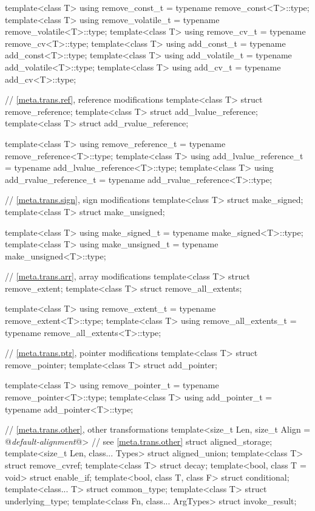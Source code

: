 \begin{codeblock}
{  template<class T>
    using remove_const_t    = typename remove_const<T>::type;
  template<class T>
    using remove_volatile_t = typename remove_volatile<T>::type;
  template<class T>
    using remove_cv_t       = typename remove_cv<T>::type;
  template<class T>
    using add_const_t       = typename add_const<T>::type;
  template<class T>
    using add_volatile_t    = typename add_volatile<T>::type;
  template<class T>
    using add_cv_t          = typename add_cv<T>::type;

  // \ref{meta.trans.ref}, reference modifications
  template<class T> struct remove_reference;
  template<class T> struct add_lvalue_reference;
  template<class T> struct add_rvalue_reference;

  template<class T>
    using remove_reference_t     = typename remove_reference<T>::type;
  template<class T>
    using add_lvalue_reference_t = typename add_lvalue_reference<T>::type;
  template<class T>
    using add_rvalue_reference_t = typename add_rvalue_reference<T>::type;

  // \ref{meta.trans.sign}, sign modifications
  template<class T> struct make_signed;
  template<class T> struct make_unsigned;

  template<class T>
    using make_signed_t   = typename make_signed<T>::type;
  template<class T>
    using make_unsigned_t = typename make_unsigned<T>::type;

  // \ref{meta.trans.arr}, array modifications
  template<class T> struct remove_extent;
  template<class T> struct remove_all_extents;

  template<class T>
    using remove_extent_t      = typename remove_extent<T>::type;
  template<class T>
    using remove_all_extents_t = typename remove_all_extents<T>::type;

  // \ref{meta.trans.ptr}, pointer modifications
  template<class T> struct remove_pointer;
  template<class T> struct add_pointer;

  template<class T>
    using remove_pointer_t = typename remove_pointer<T>::type;
  template<class T>
    using add_pointer_t    = typename add_pointer<T>::type;

  // \ref{meta.trans.other}, other transformations
  template<size_t Len, size_t Align = @\textit{default-alignment}@> // see \ref{meta.trans.other}
    struct aligned_storage;
  template<size_t Len, class... Types> struct aligned_union;
  template<class T> struct remove_cvref;
  template<class T> struct decay;
  template<bool, class T = void> struct enable_if;
  template<bool, class T, class F> struct conditional;
  template<class... T> struct common_type;
  template<class T> struct underlying_type;
  template<class Fn, class... ArgTypes> struct invoke_result;

}
\end{codeblock}
